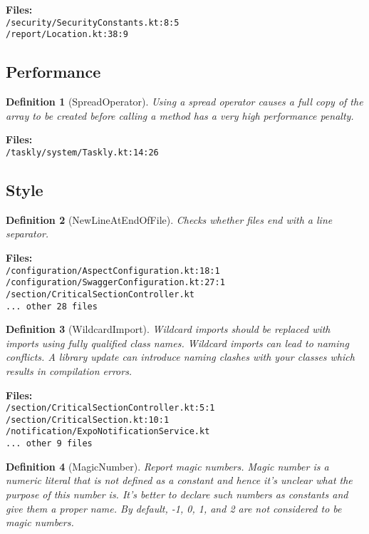 \documentclass[11pt,twocolumn]{article}
\newtheorem{definition}{Definition}
\begin{document}
\textbf{Files:} \\
\texttt{/security/SecurityConstants.kt:8:5} \\
\texttt{/report/Location.kt:38:9}

\subsection{Performance}

\begin{definition}[SpreadOperator]
Using a spread operator causes a full copy of the array to be created before calling a method has a very high performance penalty.
\end{definition}

\textbf{Files:} \\
\texttt{/taskly/system/Taskly.kt:14:26}

\subsection{Style}

\begin{definition}[NewLineAtEndOfFile]
Checks whether files end with a line separator.
\end{definition}

\textbf{Files:} \\
\texttt{/configuration/AspectConfiguration.kt:18:1} \\
\texttt{/configuration/SwaggerConfiguration.kt:27:1} \\
\texttt{/section/CriticalSectionController.kt} \\
\texttt{... other 28 files}

\begin{definition}[WildcardImport]
Wildcard imports should be replaced with imports using fully qualified class names. Wildcard imports can lead to naming conflicts. A library update can introduce naming clashes with your classes which results in compilation errors.
\end{definition}

\textbf{Files:} \\
\texttt{/section/CriticalSectionController.kt:5:1} \\
\texttt{/section/CriticalSection.kt:10:1} \\
\texttt{/notification/ExpoNotificationService.kt} \\
\texttt{... other 9 files}

\begin{definition}[MagicNumber]
Report magic numbers. Magic number is a numeric literal that is not defined as a constant and hence it's unclear what the purpose of this number is. It's better to declare such numbers as constants and give them a proper name. By default, -1, 0, 1, and 2 are not considered to be magic numbers.
\end{definition}
\end{document}
